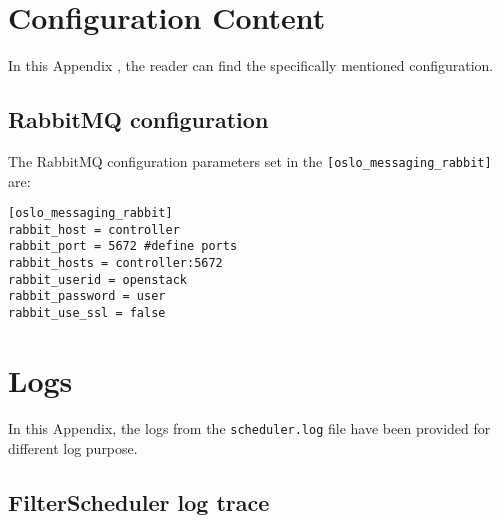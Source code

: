 
\chapter{Configuration Content}\label{app:ch:configurationcontent}

In this Appendix , the reader can find the specifically mentioned configuration.

\section{RabbitMQ configuration}\label{app:sec:rabbitmq_config}
The RabbitMQ configuration parameters set in the \verb|[oslo_messaging_rabbit]| are:
\begin{lstlisting}[frame=single]
[oslo_messaging_rabbit]
rabbit_host = controller
rabbit_port = 5672 #define ports
rabbit_hosts = controller:5672
rabbit_userid = openstack
rabbit_password = user
rabbit_use_ssl = false
\end{lstlisting}

\chapter{Logs}\label{app:ch:logs}

In this Appendix, the logs from the \verb|scheduler.log| file have been provided for different log purpose.

\section{FilterScheduler log trace}\label{app:sec:filterschedulerlogtrace}

